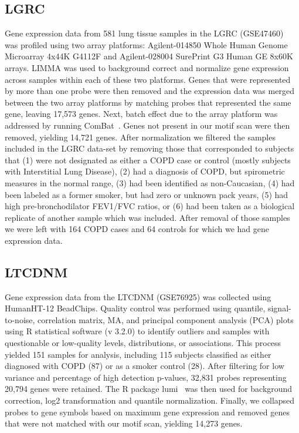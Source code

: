 \subsection*{LGRC}
Gene expression data from 581 lung tissue samples in the LGRC (GSE47460)~\cite{lgrc} was profiled using two array platforms: Agilent-014850 Whole Human Genome Microarray 4x44K G4112F and Agilent-028004 SurePrint G3 Human GE 8x60K arrays. LIMMA was used to background correct and normalize gene expression across samples within each of these two platforms. Genes that were represented by more than one probe were then removed and the expression data was merged between the two array platforms by matching probes that represented the same gene, leaving 17,573 genes. Next, batch effect due to the array platform was addressed by running ComBat~\cite{johnson2007adjusting}. Genes not present in our motif scan were then removed, yielding 14,721 genes. After normalization we filtered the samples included in the LGRC data-set by removing those that corresponded to subjects that (1) were not designated as either a COPD case or control (mostly subjects with Interstitial Lung Disease), (2) had a diagnosis of COPD, but spirometric measures in the normal range, (3) had been identified as non-Caucasian, (4) had been labeled as a former smoker, but had zero or unknown pack years, (5) had high pre-bronchodilator FEV1/FVC ratios, or (6) had been taken as a biological replicate of another sample which was included. After removal of those samples we were left with 164 COPD cases and 64 controls for which we had gene expression data. 

\subsection*{LTCDNM}
Gene expression data from the LTCDNM (GSE76925)\cite{qiu2015network} was collected using HumanHT-12 BeadChips. Quality control was performed using quantile, signal-to-noise, correlation matrix, MA, and principal component analysis (PCA) plots using R statistical software (v 3.2.0) to identify outliers and samples with questionable or low-quality levels, distributions, or associations. This process yielded 151 samples for analysis, including 115 subjects classified as either diagnosed with COPD (87) or as a smoker control (28). After filtering for low variance and percentage of high detection p-values, 32,831 probes representing 20,794 genes were retained. The R package lumi~\cite{lumi} was then used for background correction, log2 transformation and quantile normalization. Finally, we collapsed probes to gene symbols based on maximum gene expression and removed genes that were not matched with our motif scan, yielding 14,273 genes.

